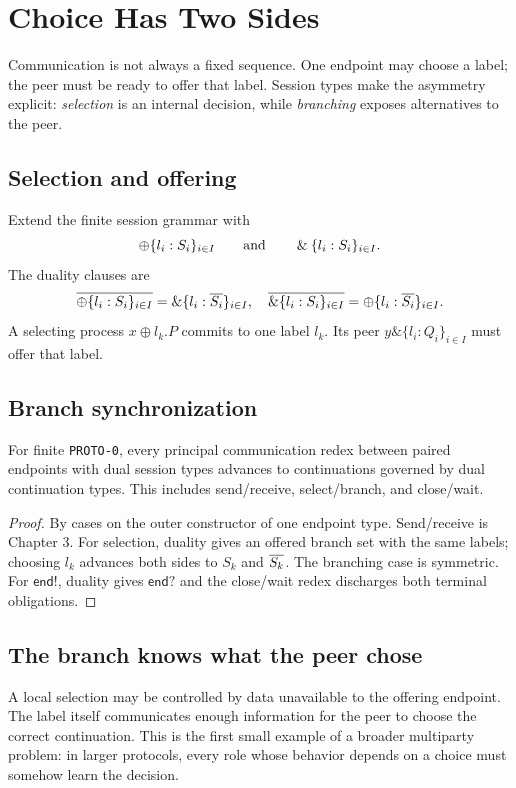 \chapter{Choice Has Two Sides}

Communication is not always a fixed sequence. One endpoint may choose a label; the peer must be ready to offer that label. Session types make the asymmetry explicit: \emph{selection} is an internal decision, while \emph{branching} exposes alternatives to the peer.

\section{Selection and offering}
Extend the finite session grammar with
\[
\oplus\{l_i:S_i\}_{i\in I}
\qquad\text{and}\qquad
\mathbin{\&}\{l_i:S_i\}_{i\in I}.
\]
The duality clauses are
\[
\overline{\oplus\{l_i:S_i\}_{i\in I}}
=\mathbin{\&}\{l_i:\overline{S_i}\}_{i\in I},
\quad
\overline{\mathbin{\&}\{l_i:S_i\}_{i\in I}}
=\oplus\{l_i:\overline{S_i}\}_{i\in I}.
\]
A selecting process $x\oplus l_k.P$ commits to one label $l_k$. Its peer $y\&\{l_i:Q_i\}_{i\in I}$ must offer that label.



\section{Branch synchronization}
\begin{proposition}
For finite \texttt{PROTO-0}, every principal communication redex between paired endpoints with dual session types advances to continuations governed by dual continuation types. This includes send/receive, select/branch, and close/wait.
\end{proposition}
\begin{proof}
By cases on the outer constructor of one endpoint type. Send/receive is Chapter 3. For selection, duality gives an offered branch set with the same labels; choosing $l_k$ advances both sides to $S_k$ and $\overline{S_k}$. The branching case is symmetric. For $\mathsf{end!}$, duality gives $\mathsf{end?}$ and the close/wait redex discharges both terminal obligations.
\end{proof}

\section{The branch knows what the peer chose}
A local selection may be controlled by data unavailable to the offering endpoint. The label itself communicates enough information for the peer to choose the correct continuation. This is the first small example of a broader multiparty problem: in larger protocols, every role whose behavior depends on a choice must somehow learn the decision.

